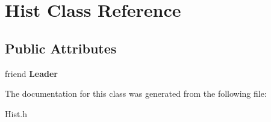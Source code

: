 \hypertarget{class_hist}{}\section{Hist Class Reference}
\label{class_hist}
\subsection*{Public Attributes}
\begin{DoxyCompactItemize}
\item 
\mbox{\label{class_hist_adf9cb2c035cf38f621ce71ba44e4b3f3}} 
friend {\bfseries Leader}
\end{DoxyCompactItemize}


The documentation for this class was generated from the following file\+:\begin{DoxyCompactItemize}
\item 
Hist.\+h\end{DoxyCompactItemize}
